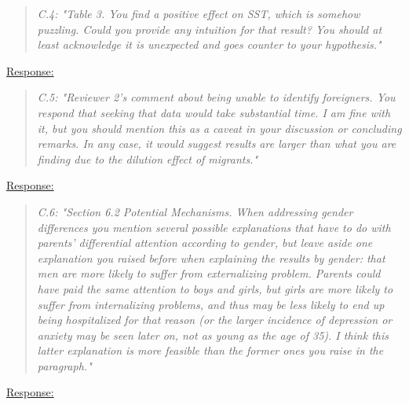 \bigskip
{}
\begin{quote}
	\textit{C.4: "Table 3. You find a positive effect on SST, which is somehow puzzling. Could you provide any intuition for that result? You should at least acknowledge it is unexpected and goes counter to your hypothesis."}
\end{quote}
\underline{Response:}











\bigskip
{}
\begin{quote}
	\textit{C.5: "Reviewer 2’s comment about being unable to identify foreigners. You respond that seeking that data would take substantial time. I am fine with it, but you should mention this as a caveat in your discussion or concluding remarks. In any case, it would suggest results are larger than what you are finding due to the dilution effect of migrants."}
\end{quote}
\underline{Response:} 







\bigskip
{}
\begin{quote}
	\textit{C.6: "Section 6.2 Potential Mechanisms. When addressing gender differences you mention several possible explanations that have to do with parents' differential attention according to gender, but leave aside one explanation you raised before when explaining the results by gender: that men are more likely to suffer from externalizing problem. Parents could have paid the same attention to boys and girls, but girls are more likely to suffer from internalizing problems, and thus may be less likely to end up being hospitalized for that reason (or the larger incidence of depression or anxiety may be seen later on, not as young as the age of 35). I think this latter explanation is more feasible than the former ones you raise in the paragraph."}
\end{quote}
\underline{Response:}



